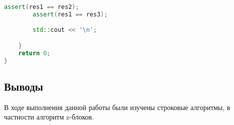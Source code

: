 \documentclass[12pt]{article}
\begin{document}
\begin{lstlisting}[language=C++]
        assert(res1 == res2);
        assert(res1 == res3);

        std::cout << '\n';

    }
    return 0;
}

\end{lstlisting}

\subsection*{Выводы}

В ходе выполнения данной работы были изучены строковые алгоритмы, в частности алгоритм z-блоков. 
\end{document}
